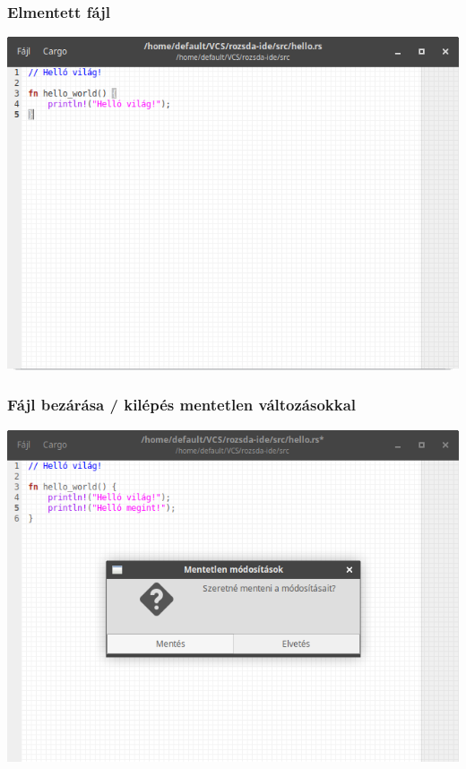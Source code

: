 \documentclass{beamer}
\begin{document}
    \begin{frame}[fragile]
        \frametitle{Elmentett fájl}

        \begin{center}
            \includegraphics[scale=0.3]{kepek/elmentett-fajl.png}
        \end{center}
    \end{frame}

    \begin{frame}[fragile]
        \frametitle{Fájl bezárása / kilépés mentetlen változásokkal}

        \begin{center}
            \includegraphics[scale=0.3]{kepek/kilepes-mentetlen-valtozasokkal.png}
        \end{center}
    \end{frame}
\end{document}
